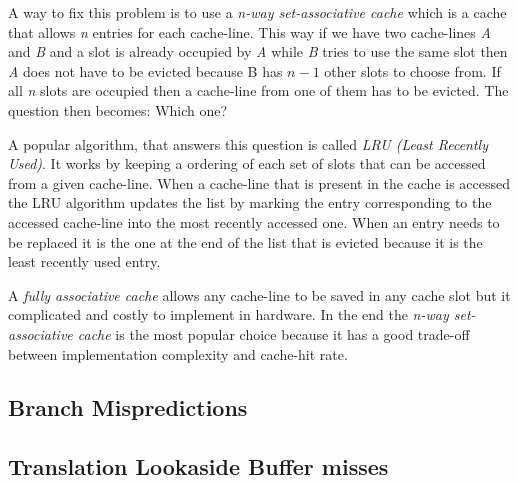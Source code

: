 A way to fix this problem is to use a \textit{n-way set-associative cache} which is a cache that allows \textit{n} entries for each cache-line.
This way if we have two cache-lines \textit{A} and \textit{B} and a slot is already occupied by \textit{A} while \textit{B} tries to use the same slot then \textit{A} does not have to be evicted because B has $n-1$ other slots to choose from.
If all \textit{n} slots are occupied then a cache-line from one of them has to be evicted.
The question then becomes: Which one?

A popular algorithm, that answers this question is called \textit{LRU (Least Recently Used)}.
It works by keeping a ordering of each set of slots that can be accessed from a given cache-line. 
When a cache-line that is present in the cache is accessed the LRU algorithm updates the list by marking the entry corresponding to the accessed cache-line into the most recently accessed one.
When an entry needs to be replaced it is the one at the end of the list that is evicted because it is the least recently used entry.

A \textit{fully associative cache} allows any cache-line to be saved in any cache slot but it complicated and costly to implement in hardware.
In the end the \textit{n-way set-associative cache} is the most popular choice because it has a good trade-off between implementation complexity and cache-hit rate.




\subsection{Branch Mispredictions}

\subsection{Translation Lookaside Buffer misses}
